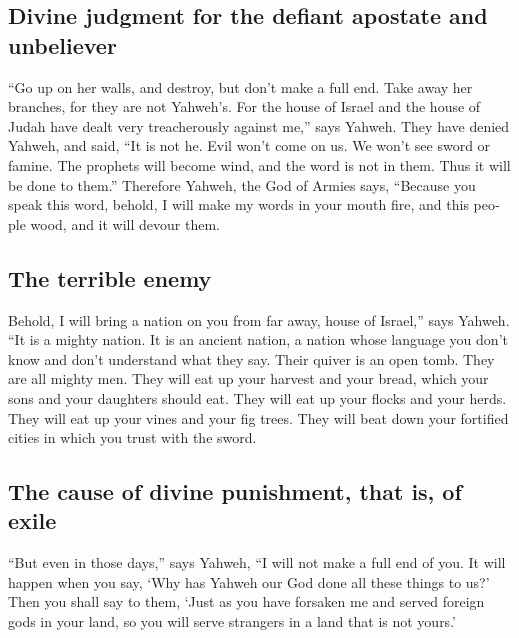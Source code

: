 \begin{paracol}{2}
\begin{otherlanguage}{english}
\hypertarget{divine-judgment-for-the-defiant-apostate-and-unbeliever}{%
\subsection{Divine judgment for the defiant apostate and
unbeliever}\label{divine-judgment-for-the-defiant-apostate-and-unbeliever}}

 ``Go up on her walls, and destroy, but don't make a full
end. Take away her branches, for they are not Yahweh's. 
For the house of Israel and the house of Judah have dealt very
treacherously against me,'' says Yahweh.  They have
denied Yahweh, and said, ``It is not he. Evil won't come on us. We won't
see sword or famine.  The prophets will become wind, and
the word is not in them. Thus it will be done to them.'' 
Therefore Yahweh, the God of Armies says, ``Because you speak this word,
behold, I will make my words in your mouth fire, and this people wood,
and it will devour them.

\hypertarget{the-terrible-enemy}{%
\subsection{The terrible enemy}\label{the-terrible-enemy}}

 Behold, I will bring a nation on you from far away,
house of Israel,'' says Yahweh. ``It is a mighty nation. It is an
ancient nation, a nation whose language you don't know and don't
understand what they say.  Their quiver is an open tomb.
They are all mighty men.  They will eat up your harvest
and your bread, which your sons and your daughters should eat. They will
eat up your flocks and your herds. They will eat up your vines and your
fig trees. They will beat down your fortified cities in which you trust
with the sword.

\hypertarget{the-cause-of-divine-punishment-that-is-of-exile}{%
\subsection{The cause of divine punishment, that is, of
exile}\label{the-cause-of-divine-punishment-that-is-of-exile}}

 ``But even in those days,'' says Yahweh, ``I will not
make a full end of you.  It will happen when you say,
`Why has Yahweh our God done all these things to us?' Then you shall say
to them, `Just as you have forsaken me and served foreign gods in your
land, so you will serve strangers in a land that is not yours.'


\end{otherlanguage}
\end{paracol}
